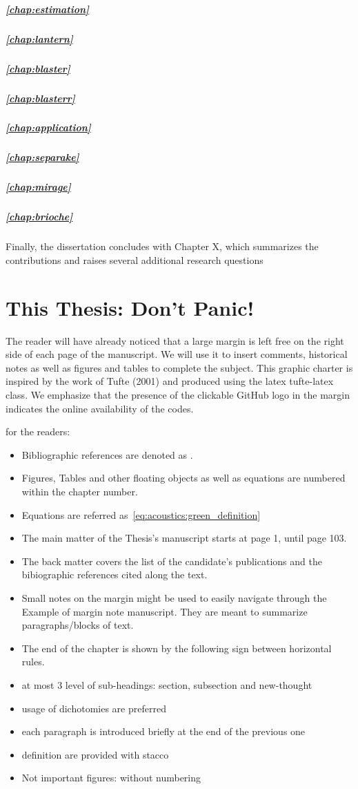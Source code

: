 \subparagraph{\cref{chap:estimation}}\blindtext
\subparagraph{\cref{chap:lantern}}\blindtext
\subparagraph{\cref{chap:blaster}}\blindtext
\subparagraph{\cref{chap:blasterr}}\blindtext


\subparagraph{\cref{chap:application}}\blindtext
\subparagraph{\cref{chap:separake}}\blindtext
\subparagraph{\cref{chap:mirage}}\blindtext
\subparagraph{\cref{chap:brioche}}\blindtext


Finally, the dissertation concludes with Chapter X, which summarizes
the contributions and raises several additional research questions


\section{This Thesis: Don't Panic!}
The reader will have already noticed that a large margin is left free on the right side of each page of the manuscript.
We will use it to insert comments, historical notes as well as figures and tables to complete the subject.
This graphic charter is inspired by the work of Tufte (2001) and produced using the latex tufte-latex class.
We emphasize that the presence of the clickable GitHub logo in the margin indicates the online availability of the codes.

 for the readers:
\begin{itemize}
    \item Bibliographic references are denoted as \cite{kuttruff2016room}.
    \item Figures, Tables and other floating objects as well as equations are numbered within the chapter number.
    \item Equations are referred as~\cref{eq:acoustics:green_definition}
    \item The main matter of the Thesis’s manuscript starts at page 1, until page 103.
    \item The back matter covers the list of the candidate’s publications and the bibiographic references cited along the text.
    \item Small notes on the margin might be used to easily navigate through the Example of margin note manuscript. They are meant to summarize paragraphs/blocks of text.
    \item The end of the chapter is shown by the following sign between horizontal rules.
\end{itemize}

\begin{itemize}
    \item at most 3 level of sub-headings: section, subsection and new-thought
    \item usage of dichotomies are preferred
    \item each paragraph is introduced briefly at the end of the previous one
    \item definition are provided with stacco
    \item Not important figures: without numbering
\end{itemize}
